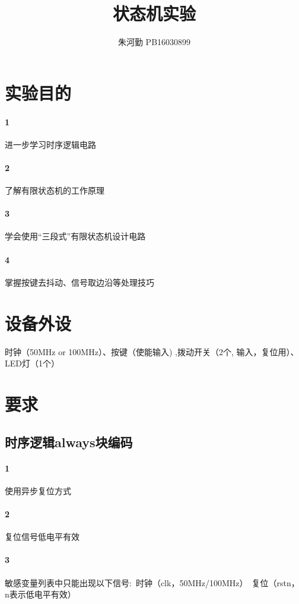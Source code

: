 \documentclass[UTF8]{ctexart}
\title{状态机实验}
\author{朱河勤   PB16030899}
\begin{document}
\maketitle
\tableofcontents

\section{实验目的}

\paragraph{1}进一步学习时序逻辑电路
\paragraph{2}了解有限状态机的工作原理
\paragraph{3}学会使用“三段式”有限状态机设计电路
\paragraph{4}掌握按键去抖动、信号取边沿等处理技巧


\section{设备外设}
时钟（50MHz or 100MHz）、按键（使能输入)  ,拨动开关（2个, 输入，复位用）、LED灯（1个）

\section{要求}
\subsection{时序逻辑always块编码}
\paragraph{1}使用异步复位方式
\paragraph{2}复位信号低电平有效
\paragraph{3}敏感变量列表中只能出现以下信号:\
时钟（clk，50MHz/100MHz）\
复位（rstn，n表示低电平有效）
\end{document}
